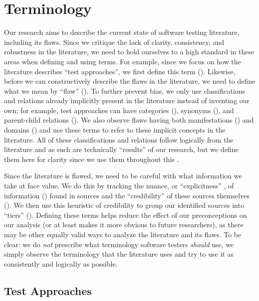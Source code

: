 \section{Terminology}\label{terminology}

Our research aims to describe the current state of software testing literature,
including its flaws. Since we critique the lack of clarity, consistency, and
robustness in the literature, we need to hold ourselves to a high standard in
these areas when defining and using terms. For example, since we focus
on how the literature describes ``test approaches'', we first define this term
(). Likewise, before we can constructively describe
the flaws in the literature, we need to define what we mean by ``flaw''
(). To further prevent bias, we only use classifications and
relations already implicitly present in the literature instead of
inventing our own; for example, test approaches can have categories
(), synonyms (), and parent-child relations
(). We also observe flaws having both manifestations
() and domains () and use
these terms to refer to these implicit concepts in the literature. All of these
classifications and relations follow logically from the literature and as such
are technically ``results'' of our research, but we define them here for
clarity since we use them throughout this \docType{}.

Since the literature is flawed, we need to be careful with what information we
take at face value. We do this by tracking the nuance, or ``explicitness''%
, of information () found in sources and
the ``credibility'' of these sources themselves (). We then use this
heuristic of credibility to group our identified sources into ``tiers''
(). Defining these terms helps reduce the effect of our
preconceptions on our analysis (or at least makes it more obvious to future
researchers), as there may be other equally valid ways to analyze the
literature and its flaws. To be clear: we do \emph{not} prescribe what
terminology software testers \emph{should} use, we simply observe the
terminology that the literature uses and try to use it as consistently and
logically as possible.

\ifnotpaper\newpage\fi
\subsection{Test Approaches}\label{approach-def}

